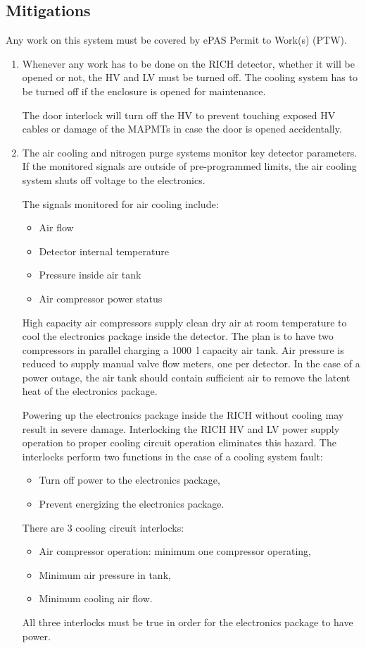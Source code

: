 \subsection{Mitigations}
Any work on this system must be covered by ePAS Permit to Work(s) (PTW).
\begin{enumerate}
\item Whenever any work has to be done on the RICH detector, whether it will be opened or not, the 
HV and LV must be turned off. The cooling system has to be turned off if the enclosure is opened 
for maintenance. 

The door interlock will turn off the HV to prevent touching exposed HV cables or damage of the MAPMTs 
in case the door is opened accidentally.

\item The air cooling and nitrogen purge systems monitor key detector parameters. If the monitored 
signals are outside of pre-programmed limits, the air cooling system shuts off voltage to the 
electronics.

The signals monitored for air cooling include:
\begin{itemize}
\item Air flow
\item Detector internal temperature
\item Pressure inside air tank
\item Air compressor power status
\end{itemize}

High capacity air compressors supply clean dry air at room temperature to cool the electronics 
package inside the detector. The plan is to have two compressors in parallel charging a 1000~l 
capacity air tank. Air pressure is reduced to supply manual valve flow meters, one per detector. 
In the case of a power outage, the air tank should contain sufficient air to remove the latent 
heat of the electronics package.

Powering up the electronics package inside the RICH without cooling may result in severe damage. 
Interlocking the RICH HV and LV power supply operation to proper cooling circuit operation 
eliminates this hazard. The interlocks perform two functions in the case of a cooling system fault:
\begin{itemize}
\item Turn off power to the electronics package,
\item  Prevent energizing the electronics package.
\end{itemize}
There are 3 cooling circuit interlocks:
\begin{itemize}
\item Air compressor operation: minimum one compressor operating,
\item Minimum air pressure in tank,
\item Minimum cooling air flow.
\end{itemize}
All three interlocks must be true in order for the electronics package to have power.


\end{enumerate}
